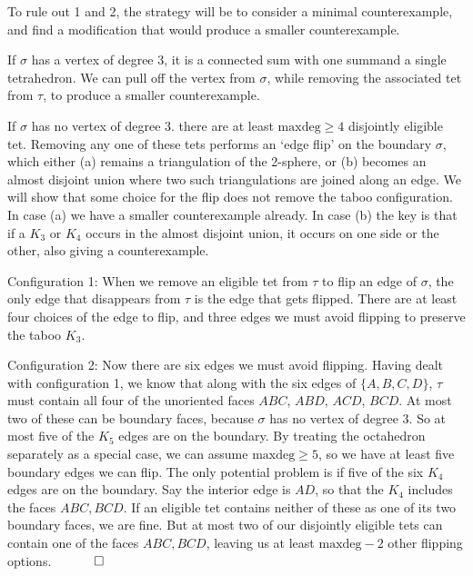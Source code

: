 \documentclass[12pt]{article}
\newcommand{\proofend}{$\quad \qed$}
\newcommand{\kw}{\mathrm}
\newcommand{\maxdeg}{\kw{maxdeg}}
\begin{document}
To rule out 1 and 2,
the strategy will be to consider a minimal counterexample,
and find a modification that would produce a smaller counterexample.

If $\sigma$ has a vertex of degree 3,
it is a connected sum with one summand a single tetrahedron.
We can pull off the vertex from $\sigma$, while removing the associated
tet from $\tau$, to produce a smaller counterexample.

If $\sigma$ has no vertex of degree 3.
there are at least $\maxdeg \geq 4$ disjointly eligible tet.
Removing any one of these tets performs an `edge flip' on the boundary
$\sigma$,
which either (a) remains a triangulation of the 2-sphere,
or (b) becomes an almost disjoint union where
two such triangulations are joined along an edge.
We will show that some choice for the flip does not remove the taboo
configuration.
In case (a) we have a smaller counterexample already.
In case (b) the key is that if a $K_3$ or $K_4$ occurs
in the almost disjoint union, it occurs on one side or the other,
also giving a counterexample.

Configuration 1:
When we remove an eligible tet from $\tau$ to flip an edge of $\sigma$,
the only edge that disappears from $\tau$ is the edge that gets flipped.
There are at least four choices of the edge to flip, and three edges we must
avoid flipping to preserve the taboo $K_3$.

Configuration 2:
Now there are six edges we must avoid flipping.
Having dealt with configuration 1,
we know that along with the six edges of $\{A,B,C,D\}$,
$\tau$ must contain all four of the unoriented faces
$ABC$, $ABD$, $ACD$, $BCD$.
At most two of these can be boundary faces, because
$\sigma$ has no vertex of degree 3.
So at most five of the $K_5$ edges are on the boundary.
By treating the octahedron separately as a special case,
we can assume $\maxdeg \geq 5$,
so we have at least five boundary edges we can flip.
The only potential problem is if five of the six $K_4$ edges are
on the boundary.
Say the interior edge is $AD$,
so that the $K_4$ includes the faces $ABC,BCD$.
If an eligible tet contains neither of these as one of its two boundary faces,
we are fine.
But at most two of our disjointly eligible tets
can contain one of the faces $ABC,BCD$,
leaving us at least $\maxdeg-2$ other flipping options.
\proofend



\end{document}

